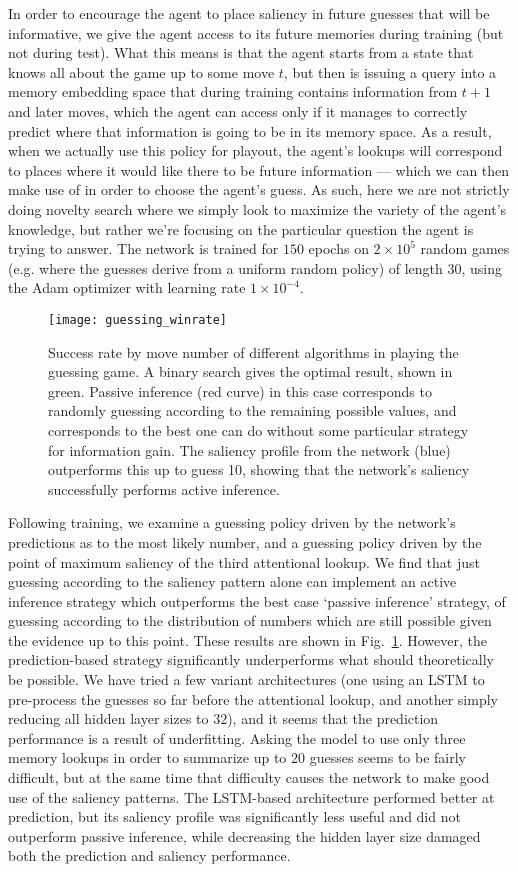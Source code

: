 \documentclass[letterpaper]{article}
\begin{document}
In order to encourage the agent to place saliency in future guesses that will be informative, we give the agent access to its future memories during training (but not during test). What this means is that the agent starts from a state that knows all about the game up to some move $t$, but then is issuing a query into a memory embedding space that during training contains information from $t+1$ and later moves, which the agent can access only if it manages to correctly predict where that information is going to be in its memory space. As a result, when we actually use this policy for playout, the agent's lookups will correspond to places where it would like there to be future information --- which we can then make use of in order to choose the agent's guess. As such, here we are not strictly doing novelty search where we simply look to maximize the variety of the agent's knowledge, but rather we're focusing on the particular question the agent is trying to answer. The network is trained for $150$ epochs on $2\times 10^5$ random games (e.g. where the guesses derive from a uniform random policy) of length 30, using the Adam optimizer with learning rate $1\times 10^{-4}$. 

\begin{figure}
 \texttt{[image: guessing\_winrate]}
 \caption{\label{GuessingWin} Success rate by move number of different algorithms in playing the guessing game. A binary search gives the optimal result, shown in green. Passive inference (red curve) in this case corresponds to randomly guessing according to the remaining possible values, and corresponds to the best one can do without some particular strategy for information gain. The saliency profile from the network (blue) outperforms this up to guess 10, showing that the network's saliency successfully performs active inference.}
\end{figure}

Following training, we examine a guessing policy driven by the network's predictions as to the most likely number, and a guessing policy driven by the point of maximum saliency of the third attentional lookup. We find that just guessing according to the saliency pattern alone can implement an active inference strategy which outperforms the best case `passive inference' strategy, of guessing according to the distribution of numbers which are still possible given the evidence up to this point. These results are shown in Fig.~\ref{GuessingWin}. However, the prediction-based strategy significantly underperforms what should theoretically be possible. We have tried a few variant architectures (one using an LSTM to pre-process the guesses so far before the attentional lookup, and another simply reducing all hidden layer sizes to $32$), and it seems that the prediction performance is a result of underfitting. Asking the model to use only three memory lookups in order to summarize up to $20$ guesses seems to be fairly difficult, but at the same time that difficulty causes the network to make good use of the saliency patterns. The LSTM-based architecture performed better at prediction, but its saliency profile was significantly less useful and did not outperform passive inference, while decreasing the hidden layer size damaged both the prediction and saliency performance.
\end{document}

